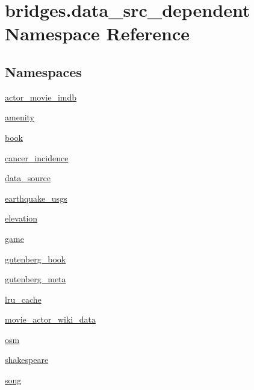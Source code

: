 \hypertarget{namespacebridges_1_1data__src__dependent}{}\section{bridges.\+data\+\_\+src\+\_\+dependent Namespace Reference}
\label{namespacebridges_1_1data__src__dependent}
\subsection*{Namespaces}
\begin{DoxyCompactItemize}
\item 
 \hyperlink{namespacebridges_1_1data__src__dependent_1_1actor__movie__imdb}{actor\+\_\+movie\+\_\+imdb}
\item 
 \hyperlink{namespacebridges_1_1data__src__dependent_1_1amenity}{amenity}
\item 
 \hyperlink{namespacebridges_1_1data__src__dependent_1_1book}{book}
\item 
 \hyperlink{namespacebridges_1_1data__src__dependent_1_1cancer__incidence}{cancer\+\_\+incidence}
\item 
 \hyperlink{namespacebridges_1_1data__src__dependent_1_1data__source}{data\+\_\+source}
\item 
 \hyperlink{namespacebridges_1_1data__src__dependent_1_1earthquake__usgs}{earthquake\+\_\+usgs}
\item 
 \hyperlink{namespacebridges_1_1data__src__dependent_1_1elevation}{elevation}
\item 
 \hyperlink{namespacebridges_1_1data__src__dependent_1_1game}{game}
\item 
 \hyperlink{namespacebridges_1_1data__src__dependent_1_1gutenberg__book}{gutenberg\+\_\+book}
\item 
 \hyperlink{namespacebridges_1_1data__src__dependent_1_1gutenberg__meta}{gutenberg\+\_\+meta}
\item 
 \hyperlink{namespacebridges_1_1data__src__dependent_1_1lru__cache}{lru\+\_\+cache}
\item 
 \hyperlink{namespacebridges_1_1data__src__dependent_1_1movie__actor__wiki__data}{movie\+\_\+actor\+\_\+wiki\+\_\+data}
\item 
 \hyperlink{namespacebridges_1_1data__src__dependent_1_1osm}{osm}
\item 
 \hyperlink{namespacebridges_1_1data__src__dependent_1_1shakespeare}{shakespeare}
\item 
 \hyperlink{namespacebridges_1_1data__src__dependent_1_1song}{song}
\end{DoxyCompactItemize}
